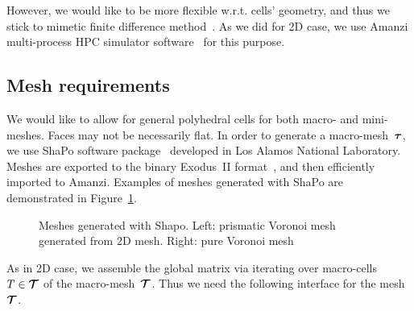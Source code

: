 However, we would like to be more flexible w.r.t. cells' geometry, and thus we stick to mimetic finite difference method~\cite{MFDbook}. As we did for 2D case, we use Amanzi multi-process HPC simulator software~\cite{amanzi} for this purpose.

\subsection{Mesh requirements}

We would like to allow for general polyhedral cells for both macro- and mini-meshes. Faces may not be necessarily flat. In order to generate a macro-mesh~${\boldsymbol{\mathbf{\mathcal \tau}}}$, we use ShaPo software package~\cite{shapo2d, shapo3d} developed in Los Alamos National Laboratory. Meshes are exported to the binary Exodus~II format~\cite{exo}, and then efficiently imported to Amanzi. Examples of meshes generated with ShaPo are demonstrated in Figure~\ref{fig:shapo}.

\begin{figure}[H]
	\centering
	\begin{subfigure}{.1\linewidth}\end{subfigure}%
	\begin{subfigure}{.4\linewidth}
		\centering
	\end{subfigure}%
	\begin{subfigure}{.4\linewidth}
		\centering
	\end{subfigure}%
	\begin{subfigure}{.1\linewidth}\end{subfigure}%
	\caption{Meshes generated with Shapo. Left: prismatic Voronoi mesh generated from 2D mesh. Right: pure Voronoi mesh}
	\label{fig:shapo}		
\end{figure}

As in 2D case, we assemble the global matrix via iterating over macro-cells~$T \in {\boldsymbol{\mathbf{\mathcal T}}}$ of the macro-mesh~${\boldsymbol{\mathbf{\mathcal T}}}$. Thus we need the following interface for the mesh~${\boldsymbol{\mathbf{\mathcal T}}}$.

